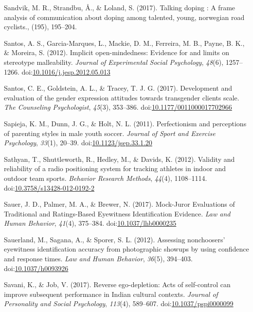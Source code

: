 \documentclass[english,man]{apa6}
\begin{document}
\hypertarget{ref-Sandvik2017}{}
Sandvik, M. R., Strandbu, Å., \& Loland, S. (2017). Talking doping : A
frame analysis of communication about doping among talented, young,
norwegian road cyclists., (195), 195--204.

\hypertarget{ref-Santos2012}{}
Santos, A. S., Garcia-Marques, L., Mackie, D. M., Ferreira, M. B.,
Payne, B. K., \& Moreira, S. (2012). Implicit open-mindedness: Evidence
for and limits on stereotype malleability. \emph{Journal of Experimental
Social Psychology}, \emph{48}(6), 1257--1266.
doi:\href{https://doi.org/10.1016/j.jesp.2012.05.013}{10.1016/j.jesp.2012.05.013}

\hypertarget{ref-Santos2017}{}
Santos, C. E., Goldstein, A. L., \& Tracey, T. J. G. (2017). Development
and evaluation of the gender expression attitudes towards transgender
clients scale. \emph{The Counseling Psychologist}, \emph{45}(3),
353--386.
doi:\href{https://doi.org/10.1177/0011000017702966}{10.1177/0011000017702966}

\hypertarget{ref-Sapieja2011}{}
Sapieja, K. M., Dunn, J. G., \& Holt, N. L. (2011). Perfectionism and
perceptions of parenting styles in male youth soccer. \emph{Journal of
Sport and Exercise Psychology}, \emph{33}(1), 20--39.
doi:\href{https://doi.org/10.1123/jsep.33.1.20}{10.1123/jsep.33.1.20}

\hypertarget{ref-Sathyan2012}{}
Sathyan, T., Shuttleworth, R., Hedley, M., \& Davids, K. (2012).
Validity and reliability of a radio positioning system for tracking
athletes in indoor and outdoor team sports. \emph{Behavior Research
Methods}, \emph{44}(4), 1108--1114.
doi:\href{https://doi.org/10.3758/s13428-012-0192-2}{10.3758/s13428-012-0192-2}

\hypertarget{ref-Sauer2017}{}
Sauer, J. D., Palmer, M. A., \& Brewer, N. (2017). Mock-Juror
Evaluations of Traditional and Ratings-Based Eyewitness Identification
Evidence. \emph{Law and Human Behavior}, \emph{41}(4), 375--384.
doi:\href{https://doi.org/10.1037/lhb0000235}{10.1037/lhb0000235}

\hypertarget{ref-Sauerland2012}{}
Sauerland, M., Sagana, A., \& Sporer, S. L. (2012). Assessing
nonchoosers' eyewitness identification accuracy from photographic
showups by using confidence and response times. \emph{Law and Human
Behavior}, \emph{36}(5), 394--403.
doi:\href{https://doi.org/10.1037/h0093926}{10.1037/h0093926}

\hypertarget{ref-Savani2017}{}
Savani, K., \& Job, V. (2017). Reverse ego-depletion: Acts of
self-control can improve subsequent performance in Indian cultural
contexts. \emph{Journal of Personality and Social Psychology},
\emph{113}(4), 589--607.
doi:\href{https://doi.org/10.1037/pspi0000099}{10.1037/pspi0000099}
\end{document}
